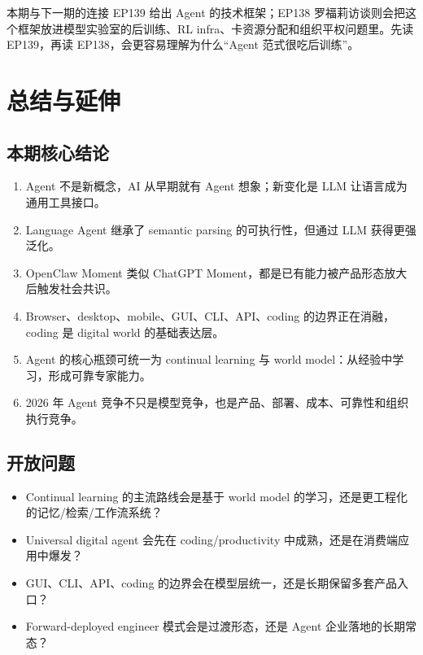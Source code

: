 \documentclass[a4paper]{article}
\begin{document}
\begin{knowledgebox}{本期与下一期的连接}
EP139 给出 Agent 的技术框架；EP138 罗福莉访谈则会把这个框架放进模型实验室的后训练、RL infra、卡资源分配和组织平权问题里。先读 EP139，再读 EP138，会更容易理解为什么“Agent 范式很吃后训练”。
\end{knowledgebox}

\section{总结与延伸}

\subsection{本期核心结论}

\begin{enumerate}
\item Agent 不是新概念，AI 从早期就有 Agent 想象；新变化是 LLM 让语言成为通用工具接口。
\item Language Agent 继承了 semantic parsing 的可执行性，但通过 LLM 获得更强泛化。
\item OpenClaw Moment 类似 ChatGPT Moment，都是已有能力被产品形态放大后触发社会共识。
\item Browser、desktop、mobile、GUI、CLI、API、coding 的边界正在消融，coding 是 digital world 的基础表达层。
\item Agent 的核心瓶颈可统一为 continual learning 与 world model：从经验中学习，形成可靠专家能力。
\item 2026 年 Agent 竞争不只是模型竞争，也是产品、部署、成本、可靠性和组织执行竞争。
\end{enumerate}

\subsection{开放问题}

\begin{itemize}
\item Continual learning 的主流路线会是基于 world model 的学习，还是更工程化的记忆/检索/工作流系统？
\item Universal digital agent 会先在 coding/productivity 中成熟，还是在消费端应用中爆发？
\item GUI、CLI、API、coding 的边界会在模型层统一，还是长期保留多套产品入口？
\item Forward-deployed engineer 模式会是过渡形态，还是 Agent 企业落地的长期常态？
\end{itemize}
\end{document}
